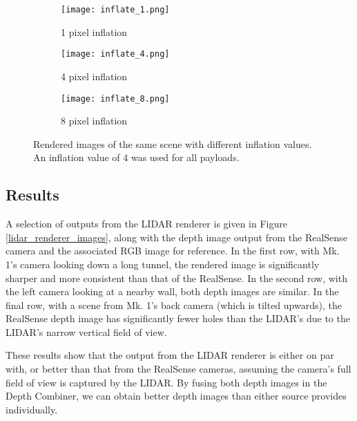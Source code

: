 \begin{figure}
	\centering
	\begin{subfigure}{0.3\textwidth}
		\texttt{[image: inflate\_1.png]}
		\caption{1 pixel inflation}
		\label{inflate_1}
	\end{subfigure}		
	\hfill
	\begin{subfigure}{0.3\textwidth}
		\texttt{[image: inflate\_4.png]}
		\caption{4 pixel inflation}
		\label{inflate_4}		
	\end{subfigure}
	\hfill
	\begin{subfigure}{0.3\textwidth}
		\texttt{[image: inflate\_8.png]}
		\caption{8 pixel inflation}
		\label{inflate_8}
	\end{subfigure}
	\caption[LIDAR renderer inflation values comparison]{Rendered images of the same scene with different inflation values. An inflation value of 4 was used for all payloads.}
	\label{lidar_inflate}
\end{figure}

\subsection{Results}

A selection of outputs from the LIDAR renderer is given in Figure \ref{lidar_renderer_images}, along with the depth image output from the RealSense camera and the associated RGB image for reference. In the first row, with Mk. 1's camera looking down a long tunnel, the rendered image is significantly sharper and more consistent than that of the RealSense. In the second row, with the left camera looking at a nearby wall, both depth images are similar. In the final row, with a scene from Mk. 1's back camera (which is tilted upwards), the RealSense depth image has significantly fewer holes than the LIDAR's due to the LIDAR's narrow vertical field of view. 

These results show that the output from the LIDAR renderer is either on par with, or better than that from the RealSense cameras, assuming the camera's full field of view is captured by the LIDAR. By fusing both depth images in the Depth Combiner, we can obtain better depth images than either source provides individually.

